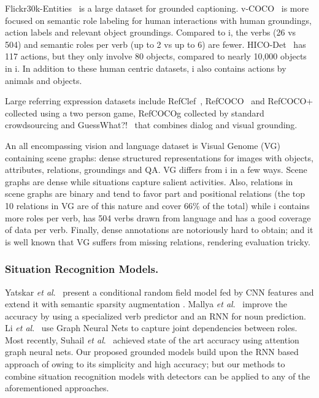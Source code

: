 \documentclass[runningheads]{llncs}
\newcommand{\etal}{\textit{et al}.\xspace}
\newcommand{\dataset}{\mbox{\sc{SW}}i\mbox{\sc{G}}\xspace}
\begin{document}
Flickr30k-Entities~\cite{flickr30kentities} is a large dataset for grounded captioning. v-COCO~\cite{gupta2015visual} is more focused on semantic role labeling for human interactions with human groundings, action labels and relevant object groundings. Compared to \dataset{}, the verbs (26 vs 504) and semantic roles per verb (up to 2 vs up to 6) are fewer. HICO-Det~\cite{hicodet} has 117 actions, but they only involve 80 objects, compared to nearly 10,000 objects in \dataset{}. In addition to these human centric datasets, \dataset{} also contains actions by animals and objects.

Large referring expression datasets include RefClef~\cite{ReferItGame}, RefCOCO~\cite{refcoco} and RefCOCO+ collected using a two person game, RefCOCOg collected by standard crowdsourcing and GuessWhat?!~\cite{GuessWhat} that combines dialog and visual grounding.


An all encompassing vision and language dataset is Visual Genome (VG)~\cite{visualgenome} containing scene graphs: dense structured representations for images with objects, attributes, relations, groundings and QA. VG differs from \dataset{} in a few ways. Scene graphs are dense while situations capture salient activities. Also, relations in scene graphs are binary and tend to favor part and positional relations (the top 10 relations in VG are of this nature and cover 66\% of the total) while \dataset{} contains more roles per verb, has 504 verbs drawn from language and has a good coverage of data per verb. Finally, dense annotations are notoriously hard to obtain; and it is well known that VG suffers from missing relations, rendering evaluation tricky.

\vspace{-5mm}
\subsubsection{Situation Recognition Models. }
Yatskar \etal~\cite{imsitu} present a conditional random field model fed by CNN features and extend it with semantic sparsity augmentation \cite{imsitucrf}. Mallya \etal~\cite{imsiturnn} improve the accuracy by using a specialized verb predictor and an RNN for noun prediction. Li \etal~\cite{li2017situation} use Graph Neural Nets to capture joint dependencies between roles. Most recently, Suhail \etal~\cite{suhail2019mixture} achieved state of the art accuracy using attention graph neural nets. Our proposed grounded models build upon the RNN based approach of \cite{imsiturnn} owing to its simplicity and high accuracy; but our methods to combine situation recognition models with detectors can be applied to any of the aforementioned approaches.
\end{document}
